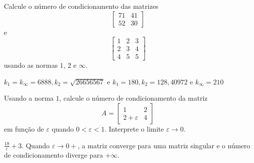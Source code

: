 \begin{exer} Calcule o número de condicionamento das matrizes
\begin{equation}\left[
\begin{array}{cc}
71 & 41\\
52 & 30
\end{array}\right]\end{equation}
e
\begin{equation}\left[
\begin{array}{ccc}
1 & 2 & 3\\
2 & 3 & 4\\
4 & 5 & 5
\end{array}\right]\end{equation}
usando as normas $1$, $2$ e $\infty$.
\end{exer}
\begin{resp}

$k_1=k_\infty=6888, k_2=\sqrt{26656567}$ e $k_1=180, k_2= 128,40972  $ e $k_\infty=210$

\end{resp}

\begin{exer}Usando a norma $1$, calcule o número de condicionamento da matriz
\begin{equation}A=\left[
\begin{array}{cc}
1 & 2\\
2+\varepsilon & 4
\end{array}\right]\end{equation}
em função de $\varepsilon$ quando $0<\varepsilon<1$. Interprete o limite $\varepsilon\to 0$.
\end{exer}
\begin{resp}

 $\frac{18}{\varepsilon}+3$. Quando $\varepsilon\to 0+$, a matriz converge para uma matriz singular e o número de condicionamento diverge para $+\infty$.

\end{resp}

